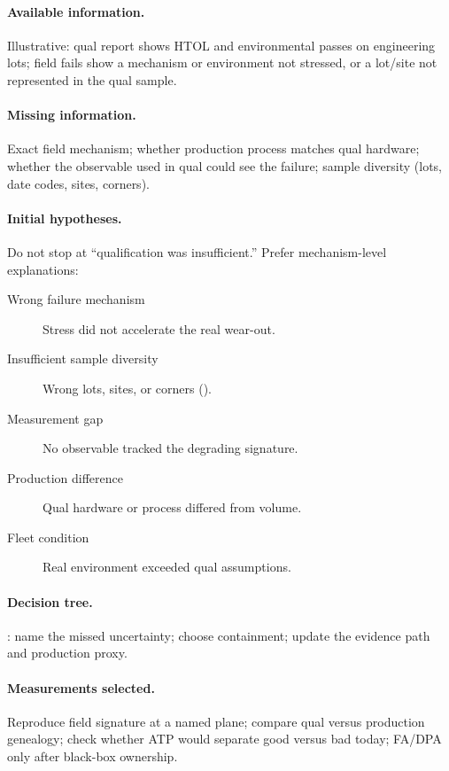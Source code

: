 \paragraph{Available information.}
Illustrative: qual report shows HTOL and environmental passes on engineering
lots; field fails show a mechanism or environment not stressed, or a lot/site
not represented in the qual sample.

\paragraph{Missing information.}
Exact field mechanism; whether production process matches qual hardware;
whether the observable used in qual could see the failure; sample diversity
(lots, date codes, sites, corners).

\paragraph{Initial hypotheses.}
Do not stop at ``qualification was insufficient.'' Prefer mechanism-level
explanations:

\begin{description}
\item[Wrong failure mechanism] Stress did not accelerate the real wear-out.
\item[Insufficient sample diversity] Wrong lots, sites, or corners
      ().
\item[Measurement gap] No observable tracked the degrading signature.
\item[Production difference] Qual hardware or process differed from volume.
\item[Fleet condition] Real environment exceeded qual assumptions.
\end{description}

\paragraph{Decision tree.}
: name the
missed uncertainty; choose containment; update the evidence path and production
proxy.

\paragraph{Measurements selected.}
Reproduce field signature at a named plane; compare qual versus production
genealogy; check whether ATP would separate good versus bad today; FA/DPA only
after black-box ownership.


